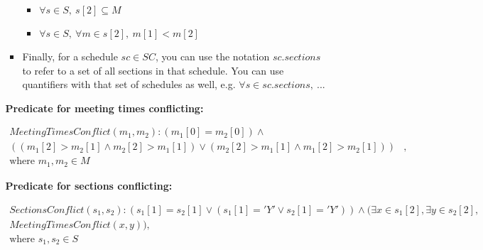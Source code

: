 \documentclass[fontsize=11pt]{article}
\begin{document}
\begin{enumerate}
\begin{enumerate}
\begin{itemize}
                          \begin{itemize}
                              \item $\forall s \in S,~ s[2] \subseteq M$
                              \item $\forall s \in S,~ \forall m \in s[2],~ m[1] < m[2]$
                          \end{itemize}

                    \item
                          Finally, for a schedule $sc \in SC$, you can use the notation $sc.sections$ to refer to a set of all sections in that schedule.
                          You can use quantifiers with that set of schedules as well, e.g.
                          $\forall s \in sc.sections,~ ...$
                \end{itemize}

                \textbf{Predicate for meeting times conflicting:}


                \begin{align*}
                    MeetingTimesConflict(m_1, m_2) : (m_1[0] = m_2[0]) \land                               &   \\
                    ((m_1[2] > m_2[1] \land m_2[2] > m_1[1]) \lor (m_2[2] > m_1[1] \land m_1[2] > m_2[1])) & , \\
                    \text{where $m_1, m_2 \in M$}                                                          &
                \end{align*}

                \smallskip

                \textbf{Predicate for sections conflicting:}


                \begin{align*}
                    SectionsConflict(s_1, s_2) : (s_1[1] = s_2[1] \lor (s_1[1] = 'Y' \lor s_2[1] = 'Y')) \land (\exists x \in s_1[2], \exists y \in s_2[2], & \\
                    MeetingTimesConflict(x, y)),                                                                                                                        & \\
                    \text{where $s_1, s_2 \in S$}                                                                                                                       &
                \end{align*}

                \smallskip


\end{enumerate}
\end{enumerate}
\end{document}
